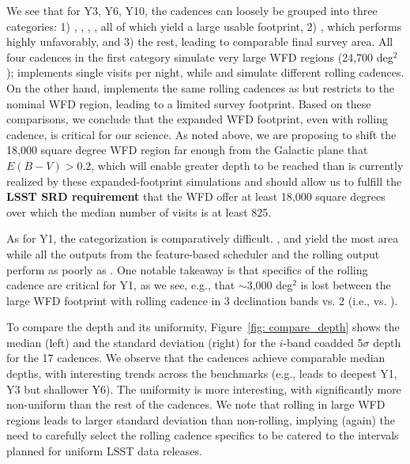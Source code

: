 We see that for Y3, Y6, Y10, the cadences can loosely be grouped into three categories: 1) , , , , all of which yield a large usable footprint, 2) , which performs highly unfavorably, and 3) the rest, leading to comparable final survey area.  All four cadences in the first category simulate very large WFD regions (24,700 deg$^2$);  implements single visits per night, while  and  simulate different rolling cadences. On the other hand,  implements the same rolling cadences as   but restricts to the nominal WFD region, leading to a limited survey footprint. Based on these comparisons, we conclude that the expanded WFD footprint, even with rolling cadence, is critical for our science.  As noted above, we are proposing to shift the 18,000 square degree WFD region far enough from the Galactic plane that $E(B-V)>0.2$, which will enable greater depth to be reached than is currently realized by these expanded-footprint simulations and should allow us to fulfill the {\bf LSST SRD requirement} that the WFD offer at least 18,000 square degrees over which the median number of visits is at least 825.  

As for Y1, the categorization is comparatively difficult.  ,  and  yield the most area while all the outputs from the feature-based scheduler and the rolling   output perform as poorly as . One notable takeaway is that specifics of the rolling cadence are critical for Y1, as we see, e.g., that $\sim$3,000 deg$^2$ is lost between the large WFD footprint with rolling cadence in 3 declination bands vs. 2 (i.e.,  vs. ).

To compare the depth and its uniformity, Figure~\ref{fig: compare_depth} shows the median (left) and the standard deviation (right) for the $i$-band coadded 5$\sigma$ depth for the 17 cadences. We observe that the cadences achieve comparable median depths, with interesting trends across the benchmarks  (e.g.,  leads to deepest Y1, Y3 but shallower Y6). The uniformity is more interesting, with  significantly more non-uniform than the rest of the cadences. We note that rolling in large WFD regions leads to larger standard deviation than non-rolling, implying (again) the need to carefully select the rolling cadence specifics to be catered to the intervals planned for uniform LSST data releases.

